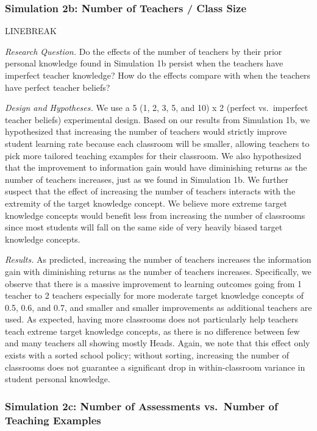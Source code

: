 \documentclass[10pt, letterpaper]{apa6}
\begin{document}
\subsubsection{Simulation 2b: Number of Teachers / Class
Size}\label{simulation-2b-number-of-teachers-class-size-1}

LINEBREAK

\emph{Research Question. } Do the effects of the number of teachers by
their prior personal knowledge found in Simulation 1b persist when the
teachers have imperfect teacher knowledge? How do the effects compare
with when the teachers have perfect teacher beliefs?

\emph{Design and Hypotheses. } We use a 5 (1, 2, 3, 5, and 10) x 2
(perfect vs.~imperfect teacher beliefs) experimental design. Based on
our results from Simulation 1b, we hypothesized that increasing the
number of teachers would strictly improve student learning rate because
each classroom will be smaller, allowing teachers to pick more tailored
teaching examples for their classroom. We also hypothesized that the
improvement to information gain would have diminishing returns as the
number of teachers increases, just as we found in Simulation 1b. We
further suspect that the effect of increasing the number of teachers
interacts with the extremity of the target knowledge concept. We believe
more extreme target knowledge concepts would benefit less from
increasing the number of classrooms since most students will fall on the
same side of very heavily biased target knowledge concepts.

\emph{Results. } As predicted, increasing the number of teachers
increases the information gain with diminishing returns as the number of
teachers increases. Specifically, we observe that there is a massive
improvement to learning outcomes going from 1 teacher to 2 teachers
especially for more moderate target knowledge concepts of 0.5, 0.6, and
0.7, and smaller and smaller improvements as additional teachers are
used. As expected, having more classrooms does not particularly help
teachers teach extreme target knowledge concepts, as there is no
difference between few and many teachers all showing mostly Heads.
Again, we note that this effect only exists with a sorted school policy;
without sorting, increasing the number of classrooms does not guarantee
a significant drop in within-classroom variance in student personal
knowledge.

\subsubsection{Simulation 2c: Number of Assessments vs.~Number of
Teaching
Examples}\label{simulation-2c-number-of-assessments-vs.number-of-teaching-examples}
\end{document}
